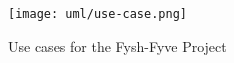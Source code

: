 \begin{figure}[h]
	\centering
	\texttt{[image: uml/use-case.png]}
	\caption{Use cases for the Fysh-Fyve Project}
	\label{fig:use-case}
\end{figure}

